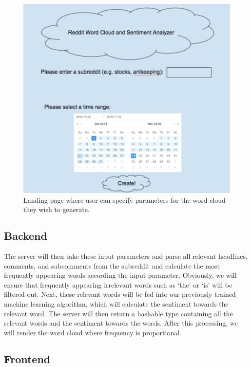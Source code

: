 \documentclass[11pt]{article}
\begin{document}
 \begin{figure}[H]
 	\centering
 	 \includegraphics[scale=0.6]{landing}
 	\caption{Landing page where user can specify parameters for the word cloud they wish to 	generate.}
 \end{figure}

\subsection{Backend}
\tab The server will then take these input parameters and parse all relevant headlines, comments, and subcomments from the subreddit and calculate the most frequently appearing words according the input parameter. Obviously, we will ensure that frequently appearing irrelevant words such as ‘the’ or ‘is’ will be filtered out. Next, these relevant words will be fed into our previously trained machine learning algorithm, which will calculate the sentiment towards the relevant word. The server will then return a hashable type containing all the relevant words and the sentiment towards the words. After this processing, we will render the word cloud where frequency is proportional. 

\subsection{Frontend}
\end{document}
